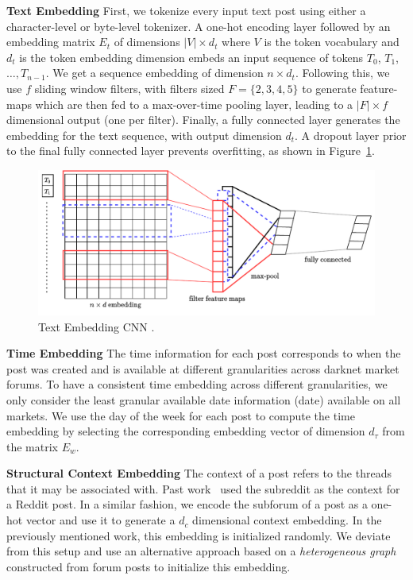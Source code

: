 \noindent \textbf{Text Embedding} First, we tokenize every input text post using either a character-level or byte-level tokenizer. 
A one-hot encoding layer followed by an embedding matrix $E_t$ of dimensions $|V| \times d_t$ where $V$ is the token vocabulary and $d_t$ is the token embedding dimension embeds an input sequence of tokens $T_0$, $T_1$, $\dots, T_{n-1}$.
We get a sequence embedding of dimension $n \times d_t$. 
Following this, we use $f$ sliding window filters, with filters sized $F = \{2, 3, 4, 5\}$ to generate feature-maps which are then fed to a max-over-time pooling layer, leading to a $|F| \times f$ dimensional output (one per filter).
Finally, a fully connected layer generates the embedding for the text sequence, with output dimension $d_t$. 
A dropout layer prior to the final fully connected layer prevents overfitting, as shown in Figure~\ref{fig:kim_cnn}. 
\begin{figure}
    \centering
    \includegraphics[width=\linewidth]{sysml/figures/TextCNN.pdf}
    \caption{Text Embedding CNN \cite{kim2014convolutional}.}
    \label{fig:kim_cnn}
\end{figure}

\noindent \textbf{Time Embedding} 
The time information for each post corresponds to when the post was created and is available at different granularities across darknet market forums. 
To have a consistent time embedding across different granularities, we only consider the least granular available date information (date) available on all markets.
We use the day of the week for each post to compute the time embedding 
by selecting the corresponding embedding vector of dimension $d_{\tau}$ from the matrix $E_w$.

\noindent \textbf{Structural Context Embedding} The context of a post refers to the threads that it may be associated with. 
Past work~\cite{andrews2019learning} used the subreddit as the context for a Reddit post.
In a similar fashion, we encode the subforum of a post as a one-hot vector and use it to generate a $d_c$ dimensional context embedding. 
In the previously mentioned work, this embedding is initialized randomly.
We deviate from this setup and use an alternative approach based on a \textit{heterogeneous graph} constructed from forum posts to initialize this embedding. 

